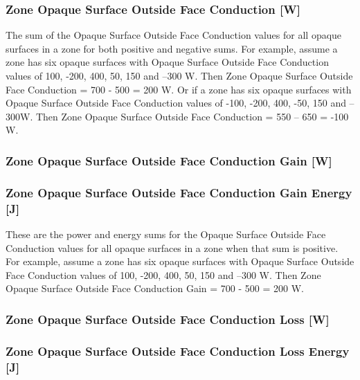 \subsubsection{Zone Opaque Surface Outside Face Conduction {[}W{]}}\label{zone-opaque-surface-outside-face-conduction-w}

The sum of the Opaque Surface Outside Face Conduction values for all opaque surfaces in a zone for both positive and negative sums. For example, assume a zone has six opaque surfaces with Opaque Surface Outside Face Conduction values of 100, -200, 400, 50, 150 and --300 W. Then Zone Opaque Surface Outside Face Conduction = 700 - 500 = 200 W. Or if a zone has six opaque surfaces with Opaque Surface Outside Face Conduction values of -100, -200, 400, -50, 150 and --300W. Then Zone Opaque Surface Outside Face Conduction = 550 -- 650 = -100 W.

\subsubsection{Zone Opaque Surface Outside Face Conduction Gain {[}W{]}}\label{zone-opaque-surface-outside-face-conduction-gain-w}

\subsubsection{Zone Opaque Surface Outside Face Conduction Gain Energy {[}J{]}}\label{zone-opaque-surface-outside-face-conduction-gain-energy-j}

These are the power and energy sums for the Opaque Surface Outside Face Conduction values for all opaque surfaces in a zone when that sum is positive. For example, assume a zone has six opaque surfaces with Opaque Surface Outside Face Conduction values of 100, -200, 400, 50, 150 and --300 W. Then Zone Opaque Surface Outside Face Conduction Gain = 700 - 500 = 200 W.

\subsubsection{Zone Opaque Surface Outside Face Conduction Loss {[}W{]}}\label{zone-opaque-surface-outside-face-conduction-loss-w}

\subsubsection{Zone Opaque Surface Outside Face Conduction Loss Energy {[}J{]}}\label{zone-opaque-surface-outside-face-conduction-loss-energy-j}

